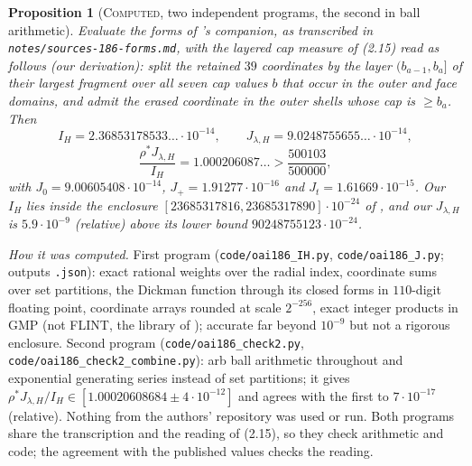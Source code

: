\documentclass[11pt]{amsart}
\newtheorem{proposition}[theorem]{Proposition}
\theoremstyle{definition}
\theoremstyle{remark}
\newcommand{\lbl}[1]{\textup{\textsc{#1}}}
\begin{document}
\begin{proposition}[\lbl{Computed}, two independent programs, the second in ball arithmetic]\label{prop:oai186-main}
Evaluate the forms of \cite{OAI26}'s companion, as transcribed in
\texttt{notes/}\allowbreak\texttt{sources-186-forms.md}, with the layered cap
measure of (2.15) read as follows (our derivation): split the retained $39$
coordinates by the layer $(b_{a-1},b_a]$ of their largest fragment over all
seven cap values $b$ that occur in the outer and face domains, and admit the
erased coordinate in the outer shells whose cap is $\ge b_a$. Then
\[
I_H=2.36853178533\ldots\cdot10^{-14},\qquad
J_{\lambda,H}=9.0248755655\ldots\cdot10^{-14},
\]
\[
\frac{\rho^*J_{\lambda,H}}{I_H}=1.000206087\ldots>\frac{500103}{500000},
\]
with $J_0=9.00605408\cdot10^{-14}$, $J_+=1.91277\cdot10^{-16}$ and
$J_t=1.61669\cdot10^{-15}$. Our $I_H$ lies inside the enclosure
$[23685317816,23685317890]\cdot10^{-24}$ of \cite[Lemma~2.5]{OAI26}, and our
$J_{\lambda,H}$ is $5.9\cdot10^{-9}$ (relative) above its lower bound
$90248755123\cdot10^{-24}$.
\end{proposition}
\noindent\emph{How it was computed.} First program
(\texttt{code/oai186\_IH.py}, \texttt{code/oai186\_J.py}; outputs \texttt{.json}):
exact rational weights over the radial index, coordinate sums over set
partitions, the Dickman function through its closed forms in $110$-digit
floating point, coordinate arrays rounded at scale $2^{-256}$, exact integer
products in GMP (not FLINT, the library of \cite{OAI26}); accurate far beyond
$10^{-9}$ but not a rigorous enclosure. Second program
(\texttt{code/oai186\_check2.py}, \texttt{code/oai186\_check2\_combine.py}):
arb ball arithmetic throughout and exponential generating series instead of set
partitions; it gives $\rho^*J_{\lambda,H}/I_H\in[1.00020608684\pm4\cdot10^{-12}]$
and agrees with the first to $7\cdot10^{-17}$ (relative). Nothing from the
authors' repository was used or run. Both programs share the transcription and
the reading of (2.15), so they check arithmetic and code; the agreement with
the published values checks the reading.
\end{document}
